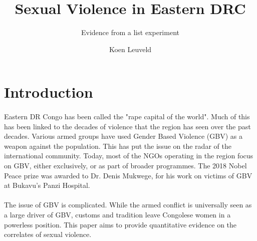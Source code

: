 \documentclass[11pt,a4paper]{scrartcl} %
\begin{document}
\author{Koen Leuveld}




\title{Sexual Violence in Eastern DRC}
\subtitle{Evidence from a list experiment} %

\maketitle



\section*{Introduction}

\paragraph{}
Eastern DR Congo has been called the "rape capital of the world". Much of this has been linked to the decades of violence that the region has seen over the past decades. Various armed groups have used Gender Based Violence (GBV) as a weapon against the population. This has put the issue on the radar of the international community. Today, most of the NGOs operating in the region focus on GBV, either exclusively, or as part of broader programmes. The 2018 Nobel Peace prize was awarded to Dr. Denis Mukwege, for his work on victims of GBV at Bukavu's Panzi Hospital.

\paragraph{}
The issue of GBV is complicated. While the armed conflict is universally seen as a large driver of GBV, customs and tradition leave Congolese women in a powerless position. This paper aims to provide quantitative evidence on the correlates of sexual violence.
\end{document}
